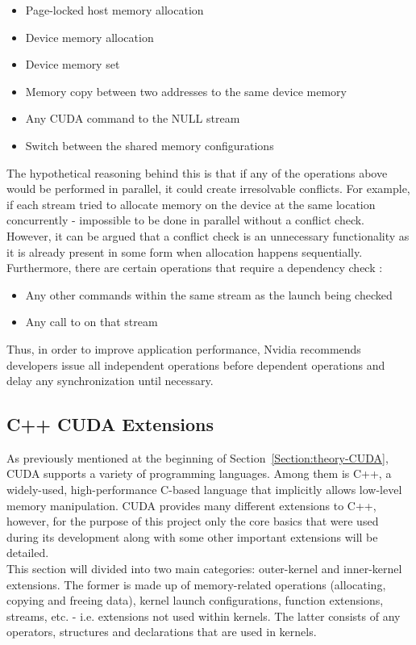 \begin{itemize}
	\item Page-locked host memory allocation
	\item Device memory allocation
	\item Device memory set
	\item Memory copy between two addresses to the same device memory
	\item Any CUDA command to the NULL stream
	\item Switch between the shared memory configurations
\end{itemize}

The hypothetical reasoning behind this is that if any of the operations above would be performed in parallel, it could create irresolvable conflicts. For example, if each stream tried to allocate memory on the device at the same location concurrently - impossible to be done in parallel without a conflict check. However, it can be argued that a conflict check is an unnecessary functionality as it is already present in some form when allocation happens sequentially. \\
Furthermore, there are certain operations that require a dependency check \cite{NVIDIAMay2022}:

\begin{itemize}
	\item Any other commands within the same stream as the launch being checked
	\item Any call to  on that stream
\end{itemize}

Thus, in order to improve application performance, Nvidia recommends developers issue all independent operations before dependent operations and delay any synchronization until necessary.


\subsection{C++ CUDA Extensions}\label{Subsection:theory-CUDA-C++-extensions}
As previously mentioned at the beginning of Section~\ref{Section:theory-CUDA}, CUDA supports a variety of programming languages. Among them is C++, a widely-used, high-performance C-based language that implicitly allows low-level memory manipulation. CUDA provides many different extensions to C++, however, for the purpose of this project only the core basics that were used during its development along with some other important extensions will be detailed. \\
This section will divided into two main categories: outer-kernel and inner-kernel extensions. The former is made up of memory-related operations (allocating, copying and freeing data), kernel launch configurations, function extensions, streams, etc. - i.e. extensions not used within kernels. The latter consists of any operators, structures and declarations that are used in kernels.

